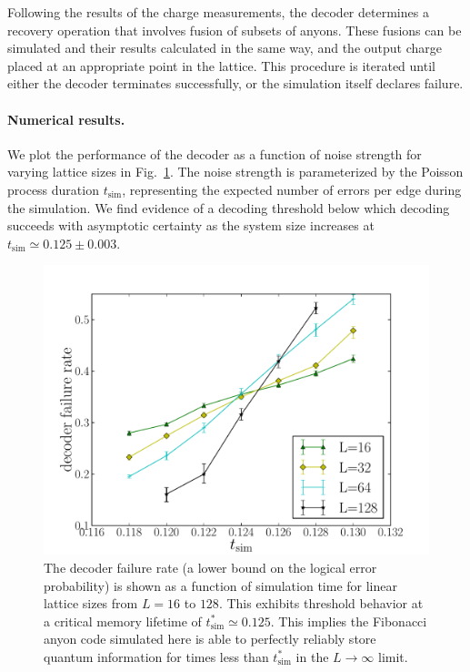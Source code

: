 \documentclass[aps, prl, letterpaper, twocolumn, superscriptaddress, notitlepage, 10pt]{revtex4}
\newcommand{\Fref}[1]{Fig.~\ref{#1}}
\begin{document}
Following the results of the charge measurements, the decoder determines 
a recovery operation that involves fusion of subsets of anyons. 
These fusions can be simulated and their results calculated in the same way, 
and the output charge placed at an appropriate point in the lattice. 
This procedure is iterated until either the decoder terminates successfully, 
or the simulation itself declares failure.


\paragraph{Numerical results.}

We plot the performance of the decoder as a function of noise strength for varying lattice sizes in 
\Fref{f:threshold}. 
The noise strength is parameterized by the Poisson process duration $t_{\mathrm{sim}}$, representing the expected number of errors per edge during the simulation. 
We find evidence of a decoding threshold below which decoding succeeds with asymptotic 
certainty as the system size increases at $t_{\mathrm{sim}}\simeq 0.125 \pm 0.003$.

\begin{figure}[t!]
\begin{center}
	\includegraphics[width=\columnwidth]{anyons-kyle.pdf}
\caption{The decoder failure rate (a lower bound on the logical error probability) is shown as a function of simulation time for linear lattice sizes from $L=16$ to $128$. 
This exhibits threshold behavior at a critical memory lifetime of $t_{\mathrm{sim}}^*\simeq 0.125$. 
This implies the Fibonacci anyon code simulated here is able to perfectly reliably store quantum information for times less than $t_{\mathrm{sim}}^*$ in the $L\to \infty$ limit.}
\label{f:threshold}
\end{center}
\vspace{-10pt}
\end{figure}
\end{document}
